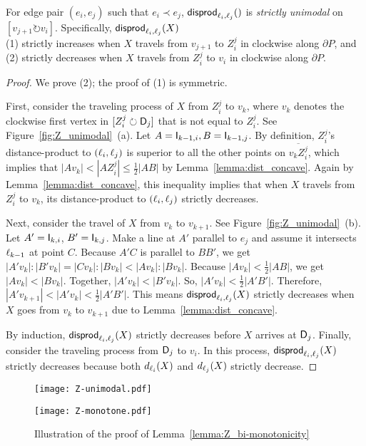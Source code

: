 \documentclass{ws-ijcga}
\begin{document}
\begin{lemma}\label{lemma:dist_unimodal}
For edge pair $(e_i,e_j)$ such that $e_i\prec e_j$, $\mathsf{disprod}_{\ell_i,\ell_j}()$ is \emph{strictly unimodal} on $[v_{j+1}\circlearrowright v_i]$. Specifically, $\mathsf{disprod}_{\ell_i,\ell_j}(X)$\\
\quad (1) strictly increases when $X$ travels from $v_{j+1}$ to $Z_i^j$ in clockwise along $\partial P$, and\\
\quad (2) strictly decreases when $X$ travels from $Z_i^j$ to $v_i$ in clockwise along $\partial P$.
\end{lemma}

\begin{proof}
We prove (2); the proof of (1) is symmetric.

First, consider the traveling process of $X$ from $Z_i^j$ to $v_k$, where $v_k$ denotes the clockwise first vertex in $[Z_i^j\circlearrowright \mathsf{D}_j]$ that is not equal to $Z_i^j$.
See Figure~\ref{fig:Z_unimodal}~(a). Let $A=\mathsf{I}_{k-1,i},B=\mathsf{I}_{k-1,j}$.
By definition, $Z_i^j$'s distance-product to $(\ell_i,\ell_j)$ is superior to all the other points on $\overline{v_kZ_i^j}$,
  which implies that $|Av_k|<|AZ_i^j|\leq \frac{1}{2}|AB|$ by Lemma~\ref{lemma:dist_concave}.
Again by Lemma~\ref{lemma:dist_concave}, this inequality implies that when $X$ travels from $Z_i^j$ to $v_k$, its distance-product to $(\ell_i,\ell_j)$ strictly decreases.

Next, consider the travel of $X$ from $v_k$ to $v_{k+1}$. See Figure~\ref{fig:Z_unimodal}~(b). Let $A'=\mathsf{I}_{k,i}$, $B'=\mathsf{I}_{k,j}$.
Make a line at $A'$ parallel to $e_j$ and assume it intersects $\ell_{k-1}$ at point $C$.
Because $A'C$ is parallel to $BB'$, we get $|A'v_k|:|B'v_k|=|Cv_k|:|Bv_k|<|Av_k|:|Bv_k|$.
Because $|Av_k|<\frac{1}{2}|AB|$, we get $|Av_k|<|Bv_k|$.
Together, $|A'v_k|<|B'v_k|$. So, $|A'v_k|<\frac{1}{2}|A'B'|$.
Therefore, $|A'v_{k+1}|<|A'v_k|<\frac{1}{2}|A'B'|$.
This means $\mathsf{disprod}_{\ell_i,\ell_j}(X)$ strictly decreases when $X$ goes from $v_k$ to $v_{k+1}$ due to Lemma~\ref{lemma:dist_concave}.

\smallskip By induction, $\mathsf{disprod}_{\ell_i,\ell_j}(X)$ strictly decreases before $X$ arrives at $\mathsf{D}_j$.
Finally, consider the traveling process from $\mathsf{D}_j$ to $v_i$.
In this process, $\mathsf{disprod}_{\ell_i,\ell_j}(X)$ strictly decreases because both $d_{\ell_i}(X)$ and $d_{\ell_j}(X)$ strictly decrease.
 \end{proof}

\begin{figure}[h]
\begin{minipage}{.66\textwidth}
\centering\texttt{[image: Z-unimodal.pdf]}
\caption{Illustration of the proof of Lemma~\ref{lemma:dist_unimodal}}\label{fig:Z_unimodal}
\end{minipage}
\begin{minipage}{.33\textwidth}
\centering\texttt{[image: Z-monotone.pdf]}
\caption{Illustration of the proof of Lemma~\ref{lemma:Z_bi-monotonicity}}\label{fig:Z_monotone}
\end{minipage}
\end{figure}
\end{document}

